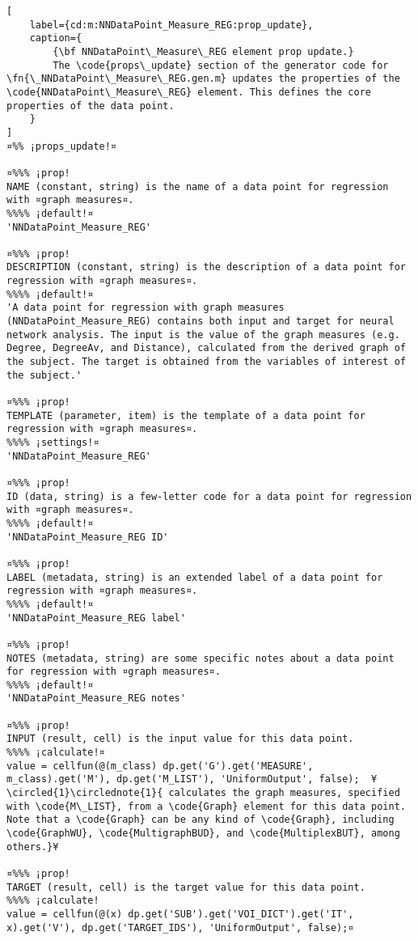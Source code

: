 \documentclass{tufte-handout}
\begin{document}
\begin{lstlisting}[
	label={cd:m:NNDataPoint_Measure_REG:prop_update},
	caption={
		{\bf NNDataPoint\_Measure\_REG element prop update.}
		The \code{props\_update} section of the generator code for \fn{\_NNDataPoint\_Measure\_REG.gen.m} updates the properties of the \code{NNDataPoint\_Measure\_REG} element. This defines the core properties of the data point.
	}
]
¤%% ¡props_update!¤

¤%%% ¡prop!
NAME (constant, string) is the name of a data point for regression with ¤graph measures¤.
%%%% ¡default!¤
'NNDataPoint_Measure_REG'

¤%%% ¡prop!
DESCRIPTION (constant, string) is the description of a data point for regression with ¤graph measures¤.
%%%% ¡default!¤
'A data point for regression with graph measures (NNDataPoint_Measure_REG) contains both input and target for neural network analysis. The input is the value of the graph measures (e.g. Degree, DegreeAv, and Distance), calculated from the derived graph of the subject. The target is obtained from the variables of interest of the subject.'

¤%%% ¡prop!
TEMPLATE (parameter, item) is the template of a data point for regression with ¤graph measures¤.
%%%% ¡settings!¤
'NNDataPoint_Measure_REG'

¤%%% ¡prop!
ID (data, string) is a few-letter code for a data point for regression with ¤graph measures¤.
%%%% ¡default!¤
'NNDataPoint_Measure_REG ID'

¤%%% ¡prop!
LABEL (metadata, string) is an extended label of a data point for regression with ¤graph measures¤.
%%%% ¡default!¤
'NNDataPoint_Measure_REG label'

¤%%% ¡prop!
NOTES (metadata, string) are some specific notes about a data point for regression with ¤graph measures¤.
%%%% ¡default!¤
'NNDataPoint_Measure_REG notes'

¤%%% ¡prop!
INPUT (result, cell) is the input value for this data point.
%%%% ¡calculate!¤ 
value = cellfun(@(m_class) dp.get('G').get('MEASURE', m_class).get('M'), dp.get('M_LIST'), 'UniformOutput', false);  ¥\circled{1}\circlednote{1}{ calculates the graph measures, specified with \code{M\_LIST}, from a \code{Graph} element for this data point. Note that a \code{Graph} can be any kind of \code{Graph}, including \code{GraphWU}, \code{MultigraphBUD}, and \code{MultiplexBUT}, among others.}¥
    
¤%%% ¡prop!
TARGET (result, cell) is the target value for this data point.
%%%% ¡calculate!
value = cellfun(@(x) dp.get('SUB').get('VOI_DICT').get('IT', x).get('V'), dp.get('TARGET_IDS'), 'UniformOutput', false);¤

\end{lstlisting}
\end{document}
